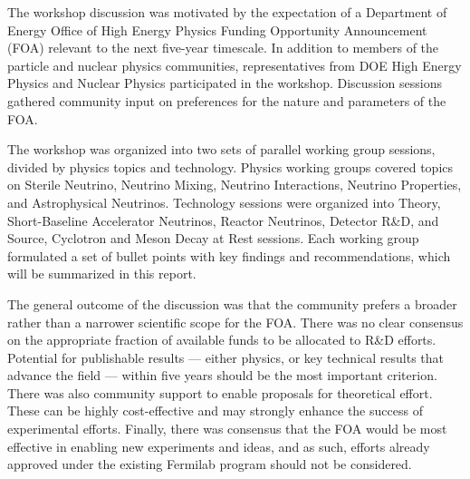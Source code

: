 
The workshop discussion was motivated by the expectation of a
Department of Energy Office of High Energy Physics Funding Opportunity
Announcement (FOA) relevant to the next five-year timescale.  In
addition to members of the particle and nuclear physics communities,
representatives from DOE High Energy Physics and Nuclear Physics
participated in the workshop.  Discussion sessions gathered community
input on preferences for the nature and parameters of the FOA.

The workshop was organized into two sets of parallel working group
sessions, divided by physics topics and technology.  Physics working
groups covered topics on Sterile Neutrino, Neutrino Mixing, Neutrino
Interactions, Neutrino Properties, and Astrophysical Neutrinos.
Technology sessions were organized into Theory, Short-Baseline
Accelerator Neutrinos, Reactor Neutrinos, Detector R\&D, and Source,
Cyclotron and Meson Decay at Rest sessions.  Each working group
formulated a set of bullet points with key findings and
recommendations, which will be summarized in this report.


The general outcome of the discussion was that the community prefers a
broader rather than a narrower scientific scope for the FOA.  There was no clear
consensus on the appropriate fraction of available funds to be
allocated to R\&D efforts.  Potential for publishable results ---
either physics, or key technical results that advance the field ---
within five years should be the most important criterion.  There was
also community support to enable proposals for theoretical effort.
These can be highly cost-effective and may strongly enhance the
success of experimental efforts.  Finally, there was consensus that
the FOA would be most effective in enabling new experiments and ideas,
and as such, efforts already approved under the existing Fermilab
program should not be considered.




